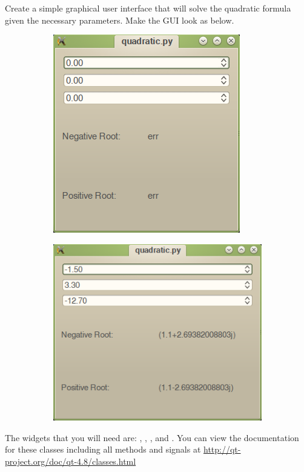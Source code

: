 \begin{problem}
Create a simple graphical user interface that will solve the quadratic formula given the necessary parameters.
Make the GUI look as below.
\begin{figure}[H]
\centering
\begin{subfigure}[b]{.49\textwidth}
\includegraphics[width=\textwidth]{quadratic_view.png}
\end{subfigure}
\begin{subfigure}[b]{.49\textwidth}
\includegraphics[width=\textwidth]{quadratic_view2.png}
\end{subfigure}
\end{figure}
The widgets that you will need are: , , , and .
You can view the documentation for these classes including all methods and signals at \url{http://qt-project.org/doc/qt-4.8/classes.html}
\end{problem}
